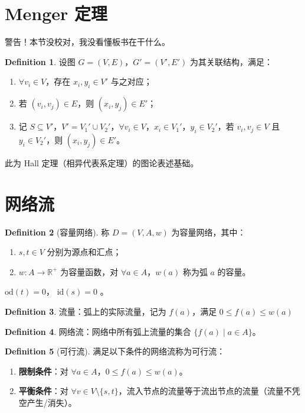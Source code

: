 \documentclass[oneside]{book}
\theoremstyle{definition}
\newtheorem{definition}{Definition}[section]
\begin{document}
\section{Menger 定理}
警告！本节没校对，我没看懂板书在干什么。
\begin{definition}
	设图 \( G = (V, E) \)，\( G' = (V', E') \) 为其关联结构，满足：
	\begin{enumerate}
		\item \( \forall v_i \in V \)，存在 \( x_i, y_i \in V' \) 与之对应；
		\item 若 \( (v_i, v_j) \in E \)，则 \( (x_i, y_j) \in E' \)；
		\item 记 \( S \subseteq V' \)，\( V' = V_1' \cup V_2' \)，\( \forall v_i \in V \)，\( x_i \in V_1' \)，\( y_i \in V_2' \)，若 \( v_i, v_j \in V \) 且 \( y_i \in V_2' \)，则 \( (x_i, y_j) \in E' \)。
	\end{enumerate}
	此为 Hall 定理（相异代表系定理）的图论表述基础。
\end{definition}

\section{网络流}
\begin{definition}[容量网络]
	称 \( D = (V, A, w) \) 为容量网络，其中：
	\begin{enumerate}
		\item \( s, t \in V \) 分别为源点和汇点；
		\item \( w: A \to \mathbb{R}^+ \) 为容量函数，对 \( \forall a \in A \)，\( w(a) \) 称为弧 \( a \) 的容量。
	\end{enumerate}
	 \( \mathrm{od}(t) = 0 \)， \( \mathrm{id}(s) = 0 \) 。
\end{definition}

\begin{definition}
流量：弧上的实际流量，记为 \( f(a) \)，满足 \( 0 \leq f(a) \leq w(a) \)
\end{definition}
\begin{definition}
网络流：网络中所有弧上流量的集合 \( \{ f(a) \mid a \in A \} \)。
\end{definition}

\begin{definition}[可行流]
	满足以下条件的网络流称为可行流：
	\begin{enumerate}
		\item \textbf{限制条件}：对 \( \forall a \in A \)，\( 0 \leq f(a) \leq w(a) \)。
		\item \textbf{平衡条件}：对 \( \forall v \in V \setminus \{s, t\} \)，流入节点的流量等于流出节点的流量（流量不凭空产生/消失）。
	\end{enumerate}
\end{definition}
\end{document}

